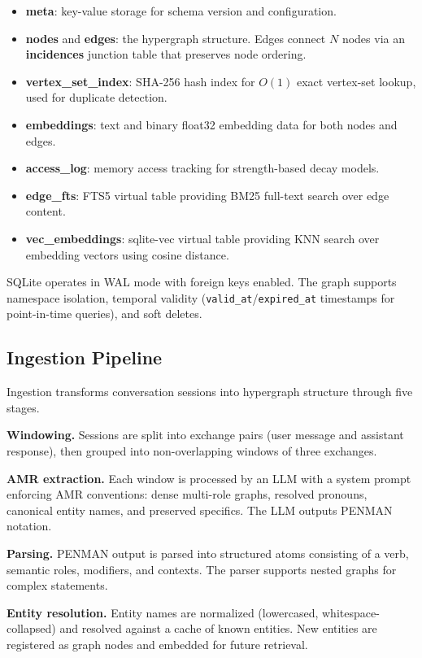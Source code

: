 \documentclass[11pt,a4paper]{article}
\begin{document}
\begin{itemize}[nosep]
  \item \textbf{meta}: key-value storage for schema version and configuration.
  \item \textbf{nodes} and \textbf{edges}: the hypergraph structure. Edges connect $N$ nodes via an \textbf{incidences} junction table that preserves node ordering.
  \item \textbf{vertex\_set\_index}: SHA-256 hash index for $O(1)$ exact vertex-set lookup, used for duplicate detection.
  \item \textbf{embeddings}: text and binary float32 embedding data for both nodes and edges.
  \item \textbf{access\_log}: memory access tracking for strength-based decay models.
  \item \textbf{edge\_fts}: FTS5 virtual table providing BM25 full-text search over edge content.
  \item \textbf{vec\_embeddings}: sqlite-vec virtual table providing KNN search over embedding vectors using cosine distance.
\end{itemize}

SQLite operates in WAL mode with foreign keys enabled. The graph supports namespace isolation, temporal validity (\texttt{valid\_at}/\texttt{expired\_at} timestamps for point-in-time queries), and soft deletes.

\subsection{Ingestion Pipeline}

Ingestion transforms conversation sessions into hypergraph structure through five stages.

\textbf{Windowing.} Sessions are split into exchange pairs (user message and assistant response), then grouped into non-overlapping windows of three exchanges.

\textbf{AMR extraction.} Each window is processed by an LLM with a system prompt enforcing AMR conventions: dense multi-role graphs, resolved pronouns, canonical entity names, and preserved specifics. The LLM outputs PENMAN notation.

\textbf{Parsing.} PENMAN output is parsed into structured atoms consisting of a verb, semantic roles, modifiers, and contexts. The parser supports nested graphs for complex statements.

\textbf{Entity resolution.} Entity names are normalized (lowercased, whitespace-collapsed) and resolved against a cache of known entities. New entities are registered as graph nodes and embedded for future retrieval.
\end{document}
